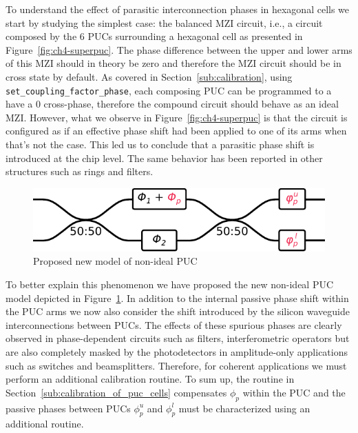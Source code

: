 To understand the effect of parasitic interconnection phases in hexagonal cells we start by studying the simplest case: the balanced MZI circuit, i.e., a circuit composed by the 6 PUCs surrounding a hexagonal cell as presented in Figure~\ref{fig:ch4-superpuc}.
The phase difference between the upper and lower arms of this MZI should in theory be zero and therefore the MZI circuit should be in cross state by default.
As covered in Section~\ref{sub:calibration}, using \lstinline|set_coupling_factor_phase|, each composing PUC can be programmed to a have a 0 cross-phase, therefore the compound circuit should behave as an ideal MZI.
However, what we observe in Figure~\ref{fig:ch4-superpuc} is that the circuit is configured as if an effective phase shift had been applied to one of its arms when that's not the case.
This led us to conclude that a parasitic phase shift is introduced at the chip level.
The same behavior has been reported in other structures such as rings and filters.

\begin{figure}
	\begin{center}
		\includegraphics{figures/ch4-pucmodel.pdf}
	\end{center}
	\caption{Proposed new model of non-ideal PUC}\label{fig:ch4-pucmodel}
\end{figure}

To better explain this phenomenon we have proposed the new non-ideal PUC model depicted in Figure~\ref{fig:ch4-pucmodel}.
In addition to the internal passive phase shift within the PUC arms we now also consider the shift introduced by the silicon waveguide interconnections between PUCs.
The effects of these spurious phases are clearly observed in phase-dependent circuits such as filters, interferometric operators but are also completely masked by the photodetectors in amplitude-only applications such as switches and beamsplitters.
Therefore, for coherent applications we must perform an additional calibration routine.
To sum up, the routine in Section~\ref{sub:calibration_of_puc_cells} compensates \(\phi_p\) within the PUC and the passive phases between PUCs \(\phi^u_p\) and \(\phi^l_p\) must be characterized using an additional routine.

